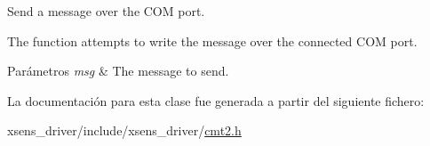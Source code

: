 \-Send a message over the \-C\-O\-M port. 

\-The function attempts to write the message over the connected \-C\-O\-M port. 
\begin{DoxyParams}{\-Parámetros}
{\em msg} & \-The message to send. \\
\hline
\end{DoxyParams}


\-La documentación para esta clase fue generada a partir del siguiente fichero\-:\begin{DoxyCompactItemize}
\item 
xsens\-\_\-driver/include/xsens\-\_\-driver/\hyperlink{cmt2_8h}{cmt2.\-h}\end{DoxyCompactItemize}
